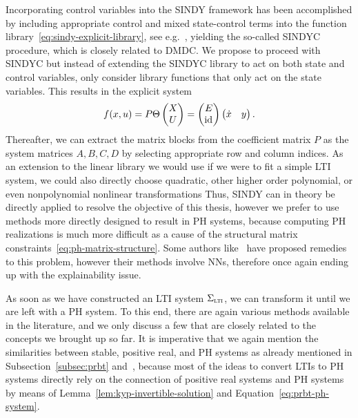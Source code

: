 Incorporating control variables into the \ac{SINDY} framework has been accomplished by including appropriate control and mixed state-control terms into the function library~\eqref{eq:sindy-explicit-library}, see e.g.~\cite{Kaiser2018}, yielding the so-called \ac{SINDYC} procedure, which is closely related to \ac{DMDC}.
We propose to proceed with \ac{SINDYC} but instead of extending the \ac{SINDYC} library to act on both state and control variables, only consider library functions that only act on the state variables.
This results in the explicit system
\begin{equation}\label{eq:sindy-io}
    f(x, u) = P \Theta \begin{pmatrix}
        X \\
        U
    \end{pmatrix} = \begin{pmatrix}
        E \\
        \text{id}_{}
    \end{pmatrix} \begin{pmatrix}
        \dot{x} & y
    \end{pmatrix}.
\end{equation}
Thereafter, we can extract the matrix blocks from the coefficient matrix $P$ as the system matrices $A, B, C, D$ by selecting appropriate row and column indices.
As an extension to the linear library we would use if we were to fit a simple \ac{LTI} system, we could also directly choose quadratic, other higher order polynomial, or even nonpolynomial nonlinear transformations
Thus, \ac{SINDY} can in theory be directly applied to resolve the objective of this thesis, however we prefer to use methods more directly designed to result in \ac{PH} systems, because computing \ac{PH} realizations is much more difficult as a cause of the structural matrix constraints~\eqref{eq:ph-matrix-structure}.
Some authors like~\cite{Lee2022} have proposed remedies to this problem, however their methods involve \acp{NN}, therefore once again ending up with the explainability issue.

As soon as we have constructed an \ac{LTI} system $\Sigma_{\textnormal{\scshape lti}}$, we can transform it until we are left with a \ac{PH} system.
To this end, there are again various methods available in the literature, and we only discuss a few that are closely related to the concepts we brought up so far.
It is imperative that we again mention the similarities between stable, positive real, and \ac{PH} systems as already mentioned in Subsection~\ref{subsec:prbt} and~\cite{Cherifi2022}, because most of the ideas to convert \acp{LTI} to \ac{PH} systems directly rely on the connection of positive real systems and \ac{PH} systems by means of Lemma~\ref{lem:kyp-invertible-solution} and Equation~\eqref{eq:prbt-ph-system}.

